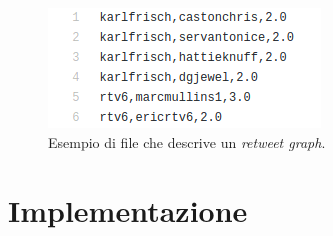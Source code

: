 \begin{figure}
\begin{center}
\includegraphics[scale=0.6]{images/retweet_input_file.png}
\end{center}
\caption{Esempio di file che descrive un \textit{retweet graph}.}
\label{fig:retweet_file}
\end{figure}



\section{Implementazione}
